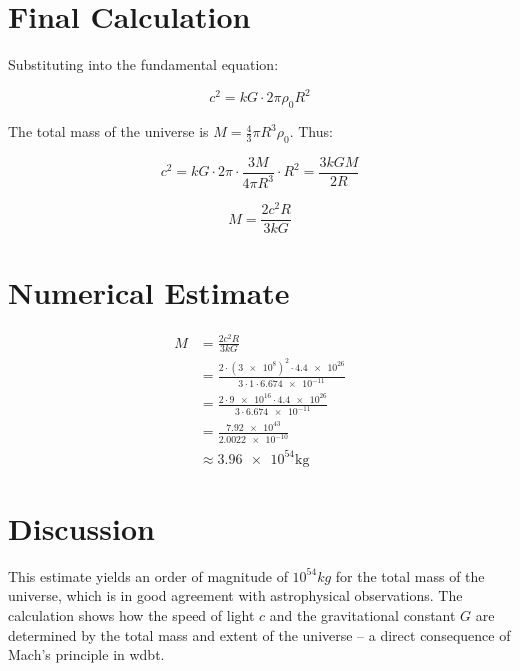 \section{Final Calculation}
Substituting into the fundamental equation:

\begin{equation}
    c^2 = k G \cdot 2\pi \rho_0 R^2
\end{equation}

The total mass of the universe is $M = \frac{4}{3} \pi R^3 \rho_0$. Thus:

\begin{equation}
    c^2 = k G \cdot 2\pi \cdot \frac{3M}{4\pi R^3} \cdot R^2 = \frac{3k G M}{2 R}
\end{equation}

\begin{equation}
    M = \frac{2 c^2 R}{3k G}
\end{equation}

\section{Numerical Estimate}
\begin{align}
M &= \frac{2 c^2 R}{3k G} \\
  &= \frac{2 \cdot (\num{3e8})^2 \cdot \num{4.4e26}}{3 \cdot 1 \cdot \num{6.674e-11}} \\
  &= \frac{2 \cdot \num{9e16} \cdot \num{4.4e26}}{3 \cdot \num{6.674e-11}} \\
  &= \frac{\num{7.92e43}}{\num{2.0022e-10}} \\
  &\approx \num{3.96e54}  \si{\kilo\gram}
\end{align}

\section{Discussion}
This estimate yields an order of magnitude of $10^{54} kg$ for the total mass of the universe, which is in good agreement with astrophysical observations. The calculation shows how the speed of light $c$ and the gravitational constant $G$ are determined by the total mass and extent of the universe – a direct consequence of Mach's principle in \gls{wdbt}.